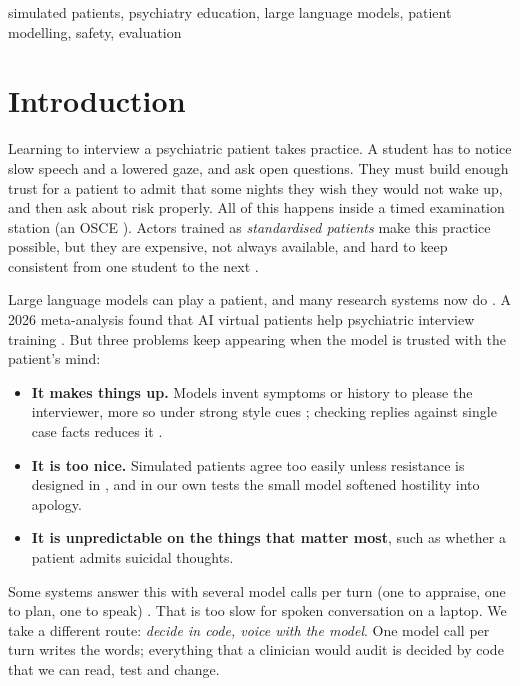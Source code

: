 \documentclass[journal]{IEEEtran}
\begin{document}
\begin{IEEEkeywords}
simulated patients, psychiatry education, large language models, patient modelling, safety, evaluation
\end{IEEEkeywords}

\section{Introduction}
Learning to interview a psychiatric patient takes practice. A student has to notice slow speech and a lowered gaze, and ask open questions. They must build enough trust for a patient to admit that some nights they wish they would not wake up, and then ask about risk properly. All of this happens inside a timed examination station (an OSCE \cite{harden1975osce}). Actors trained as \emph{standardised patients} make this practice possible, but
they are expensive, not always available, and hard to keep consistent from one student to the next \cite{piot2021simulation}.

Large language models can play a patient, and many research systems now do
\cite{chen2023llmempowered,wang2024patient,lee2025psyche,sabour2026patientact,sabour2026patienthub,louie2024roleplaydoh}. A 2026 meta-analysis
found that AI virtual patients help psychiatric interview training \cite{kilincel2026meta}. But three problems keep appearing when the
model is trusted with the patient's mind:
\begin{itemize}
\item \textbf{It makes things up.} Models invent symptoms or history to please the interviewer, more so under strong style cues \cite{chen2023llmempowered}; checking
replies against single case facts reduces it \cite{lai2025patientzero}.
\item \textbf{It is too nice.} Simulated patients agree too easily unless resistance is designed in \cite{steenstra2025scaffolding,lee2025psyche}, and in our
own tests the small model softened hostility into apology.
\item \textbf{It is unpredictable on the things that matter most}, such as whether a patient admits suicidal thoughts.
\end{itemize}

Some systems answer this with several model calls per turn (one to appraise, one to plan, one to speak) \cite{sabour2026patientact}. That is
too slow for spoken conversation on a laptop. We take a different route: \emph{decide in code, voice with the model}. One model call per turn
writes the words; everything that a clinician would audit is decided by code that we can read, test and change.
\end{document}
